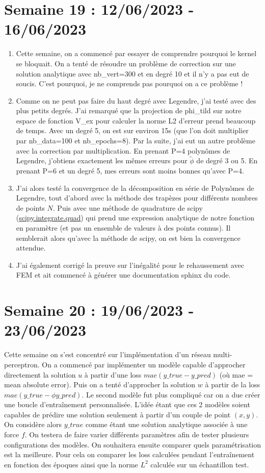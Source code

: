 \documentclass[french]{article}
\begin{document}
\section{Semaine 19 : 12/06/2023 - 16/06/2023}
	\noindent
	\begin{enumerate}[label=\textbullet]
		\item Cette semaine, on a commencé par essayer de comprendre pourquoi le kernel se bloquait. On a tenté de résoudre un problème de correction sur une solution analytique avec nb\_vert=300 et en degré 10 et il n'y a pas eut de soucis. C'est pourquoi, je ne comprends pas pourquoi on a ce problème !
		\item Comme on ne peut pas faire du haut degré avec Legendre, j'ai testé avec des plus petits degrés. J'ai remarqué que la projection de phi\_tild sur notre espace de fonction V\_ex pour calculer la norme L2 d'erreur prend beaucoup de temps. Avec un degré 5, on est sur environ 15s (que l'on doit multiplier par nb\_data=100 et nb\_epochs=8). Par la suite, j'ai eut un autre problème avec la correction par multiplication. En prenant P=4 polynômes de Legendre, j'obtiens exactement les mêmes erreurs pour $\tilde{\phi}$ de degré 3 ou 5. En prenant P=6 et un degré 5, mes erreurs sont moins bonnes qu'avec P=4.
		\item J'ai alors testé la convergence de la décomposition en série de Polynômes de Legendre, tout d'abord avec la méthode des trapèzes pour différents nombres de points $N$. Puis avec une méthode de quadrature de scipy (\href{https://docs.scipy.org/doc/scipy/reference/generated/scipy.integrate.quad.html#scipy.integrate.quad}{scipy.integrate.quad}) qui prend une expression analytique de notre fonction en paramètre (et pas un ensemble de valeurs à des points connus). Il semblerait alors qu'avec la méthode de scipy, on est bien la convergence attendue.
		\item J'ai également corrigé la preuve sur l'inégalité pour le rehaussement avec FEM et ait commencé à générer une documentation sphinx du code.
	\end{enumerate}
\section{Semaine 20 : 19/06/2023 - 23/06/2023}
	Cette semaine on s'est concentré sur l'implémentation d'un réseau multi-perceptron. On a commencé par implémenter un modèle capable d'approcher directement la solution $u$ à partir d'une loss $mae(y\_true-y\_pred)$ (où mae = mean absolute error). Puis on a tenté d'approcher la solution $w$ à partir de la loss $mae(y\_true-\phi y\_pred)$. Le second modèle fut plus compliqué car on a due créer une boucle d'entraînement personnalisée. L'idée étant que ces 2 modèles soient capables de prédire une solution seulement à partir d'un couple de point $(x,y)$. On considère alors $y\_true$ comme étant une solution analytique associée à une force $f$. On testera de faire varier différents paramètres afin de tester plusieurs configurations des modèles. On souhaitera ensuite comparer quels paramétrisation est la meilleure. Pour cela on comparer les loss calculées pendant l'entraînement en fonction des époques ainsi que la norme $L^2$ calculée sur un échantillon test.
	
\end{document}
